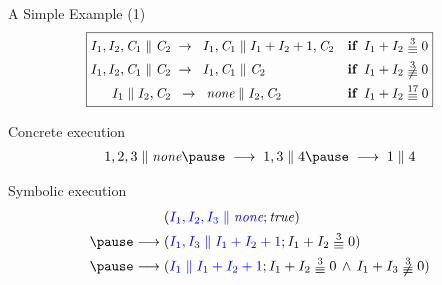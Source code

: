 \documentclass[11pt]{beamer}
\begin{document}
\begin{frame}{A Simple Example (1)}
\[
\scalebox{0.95}{
\boxed{
\begin{aligned}
I_1, I_2, \mathit{C}_1 \parallel \mathit{C}_2 &\;\rews \;\;I_1,\mathit{C}_1 \parallel I_1 + I_2 + 1, \mathit{C}_2  && \textbf{if} \;\;   I_1 + I_2 \;\raisebox{-0.5ex}{\ensuremath{\stackrel{3}{\equiv}}}\; 0 \\
I_1,I_2,\mathit{C}_1 \parallel \mathit{C}_2 &\;\rews\;\;I_1,\mathit{C}_1 \parallel \mathit{C}_2 \quad && \textbf{if} \;\;  I_1 + I_2 \;\raisebox{-0.5ex}{\ensuremath{\not\stackrel{3}{\equiv}}}\; 0 \\
I_1 \parallel I_2,\mathit{C}_2 &\;\;\rews\;\;\textit{none} \parallel I_2,\mathit{C}_2 \quad && \textbf{if}\;\; I_1 + I_2 \;\raisebox{-0.5ex}{\ensuremath{\stackrel{17}{\equiv}}}\; 0
\end{aligned}
}
}
\]
    
\begin{outeritemize}
    \item \alert{Concrete} execution
    \[
    \begin{aligned}
    1,2,3 \parallel \textit{none}
    \pause
    \;\longrightarrow\;
    1,3 \parallel 4
    \pause
    \;\longrightarrow\;
    1 \parallel 4
    \end{aligned}
    \]
    
    \pause
    \item \alert{Symbolic} execution 
    \[
    \begin{aligned}
    &
    ({\blue{I_1,I_2,I_3 \parallel \textit{none}}}; {\mathit{true}})
    \\
    \pause
    \longrightarrow\;&
    ({\blue{I_1,I_3 \parallel I_1 + I_2 + 1}}; {I_1 + I_2 \;\raisebox{-0.5ex}{\ensuremath{\stackrel{3}{\equiv}}}\; 0})
    \\
    \pause
    \longrightarrow\;&
    ({\blue{I_1 \parallel I_1 + I_2 + 1}}; {I_1 + I_2 \;\raisebox{-0.5ex}{\ensuremath{\stackrel{3}{\equiv}}}\; 0 \,\wedge\, I_1 + I_3 \;\raisebox{-0.5ex}{\ensuremath{\not\stackrel{3}{\equiv}}}\; 0})
    \end{aligned}
    \]

\end{outeritemize}
\end{frame}
\end{document}
